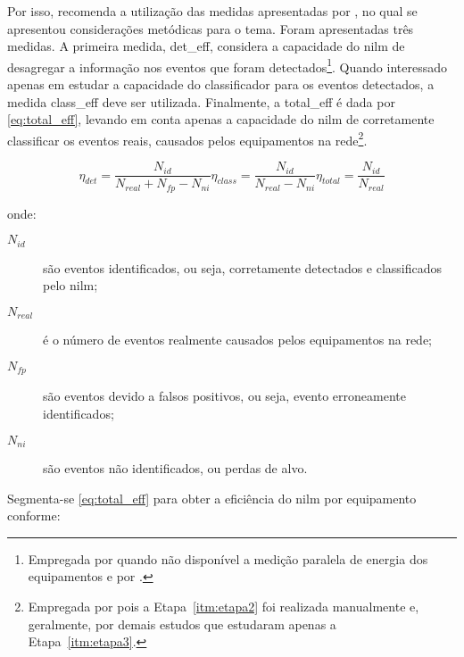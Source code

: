 Por isso, \cite{nilm_zeifman_review_2011} recomenda a utilização das
medidas apresentadas por \cite{nilm_liang_pt1_2010_34}, no qual se
apresentou considerações metódicas para o tema. Foram apresentadas
três medidas. A primeira medida, \gls{det_eff}, considera a capacidade
do \gls{nilm} de desagregar a informação nos eventos que foram
detectados\footnote{Empregada por \cite{nilm_hart_1992_8} quando não
disponível a medição paralela de energia dos equipamentos e por
\cite{nilm_gupta_patel_2010_30}.}. Quando interessado apenas em
estudar a capacidade do classificador para os eventos detectados, a
medida \gls{class_eff} deve ser utilizada. Finalmente, a
\gls{total_eff} é dada por \ref{eq:total_eff}, levando em conta apenas
a capacidade do \gls{nilm} de corretamente classificar os eventos
reais, causados pelos equipamentos na rede\footnote{Empregada por
\cite{nilm_patel_2007_29,nilm_berges_2009_36} pois a
Etapa~\ref{itm:etapa2} foi realizada manualmente
\label{fn:patel_manual} e, geralmente, por demais estudos que
estudaram apenas a Etapa~\ref{itm:etapa3}.}.

\begin{subequations}\label{eq:eff}
\begin{equation}\label{eq:det_eff}
\eta_{det} = \frac{N_{id}}{N_{real} + N_{fp} - N_{ni}}
\end{equation}
\begin{equation}\label{eq:class_eff}
\eta_{class} = \frac{N_{id}}{N_{real} - N_{ni}}
\end{equation}
\begin{equation}\label{eq:total_eff}
\eta_{total} = \frac{N_{id}}{N_{real}}
\end{equation}
\end{subequations}

\noindent onde:  

\begin{description}
\item[$N_{id}$] são eventos identificados, ou seja, corretamente
detectados e classificados pelo \gls{nilm}; 
\item[$N_{real}$] é o número de eventos realmente causados pelos
equipamentos na rede;
\item[$N_{fp}$] são eventos devido a falsos positivos, ou seja,
evento erroneamente identificados;
\item[$N_{ni}$] são eventos não identificados, ou perdas de alvo.
\end{description}

Segmenta-se \ref{eq:total_eff} para obter a eficiência do \gls{nilm}
por equipamento conforme:

